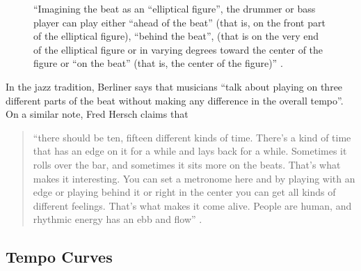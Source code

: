 \begin{figure}[thp]
  \begin{center}
    \caption{``Imagining the beat as an ``elliptical figure'', the
      drummer or bass player can play either ``ahead of the beat''
      (that is, on the front part of the elliptical figure), ``behind
      the beat'', (that is on the very end of the elliptical figure or
      in varying degrees toward the center of the figure or ``on the
      beat'' (that is, the center of the figure)'' \cite[p. 151]{Berliner:94}.}
    \label{on the beat}
  \end{center}
\end{figure}

In the jazz tradition, Berliner says that musicians ``talk about 
playing on three different parts of the beat without making any
difference in the overall tempo''. On a similar note, Fred Hersch
claims that \begin{quote} ``there should be ten, fifteen different
  kinds of time. There's a kind of time that has an edge on it for a
  while and lays back for a while. Sometimes it rolls over the bar,
  and sometimes it sits more on the beats.  That's what makes it
  interesting. You can set a metronome here and by playing with an
  edge or playing behind it or right in the center you can get all
  kinds of different feelings. That's what makes it come alive. People
  are human, and rhythmic energy has an ebb and flow'' \cite[p. 151]{Berliner:94}. \end{quote}

\vspace{5mm}
\subsection{Tempo Curves}

